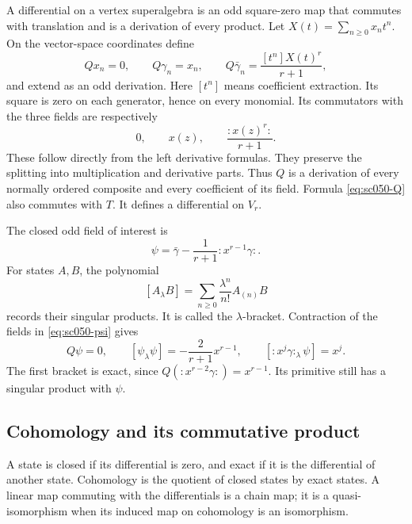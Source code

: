 A differential on a vertex superalgebra is an odd square-zero map
that commutes with translation and is a derivation of every product.
Let \(X(t)=\sum_{n\ge0}x_nt^n\). On the vector-space coordinates define
\begin{equation}\label{eq:sc050-Q}
 Qx_n=0,\qquad Q\gamma_n=x_n,\qquad
 Q\bar\gamma_n=\frac{[t^n]X(t)^r}{r+1},
\end{equation}
and extend as an odd derivation. Here \([t^n]\) means coefficient
extraction. Its square is zero on each generator, hence on every
monomial. Its commutators with the three fields are respectively
\[
 0,\qquad x(z),\qquad \frac{:x(z)^r:}{r+1}.
\]
These follow directly from the left derivative formulas. They
preserve the splitting into multiplication and derivative parts.
Thus \(Q\) is a derivation of every normally ordered composite and
every coefficient of its field. Formula \eqref{eq:sc050-Q} also
commutes with \(T\). It defines a differential on \(V_r\).

The closed odd field of interest is
\begin{equation}\label{eq:sc050-psi}
 \psi=\bar\gamma-\frac1{r+1}:x^{r-1}\gamma:.
\end{equation}
For states \(A,B\), the polynomial
\[
 [A_\lambda B]=\sum_{n\ge0}\frac{\lambda^n}{n!}A_{(n)}B
\]
records their singular products. It is called the \(\lambda\)-bracket.
Contraction of the fields in \eqref{eq:sc050-psi} gives
\begin{equation}\label{eq:sc050-primary}
 Q\psi=0,\qquad
 [\psi_\lambda\psi]=-\frac2{r+1}x^{r-1},\qquad
 [:x^j\gamma:_\lambda\psi]=x^j.
\end{equation}
The first bracket is exact, since
\(Q(:x^{r-2}\gamma:)=x^{r-1}\). Its primitive still has a singular
product with \(\psi\).

\subsection{Cohomology and its commutative product}

A state is closed if its differential is zero, and exact if it is
the differential of another state. Cohomology is the quotient of
closed states by exact states. A linear map commuting with the
differentials is a chain map; it is a quasi-isomorphism when its
induced map on cohomology is an isomorphism.

